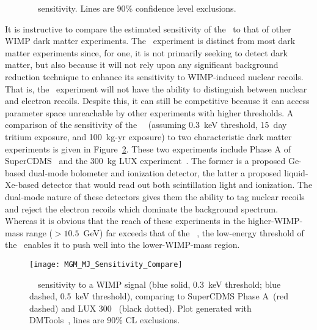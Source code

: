 			\begin{figure}
				\centering
				\def\figheight{0.41\textheight}				
				\caption[\MJ~\minmod~sensitivity to a WIMP signal]{\MJ~\minmod~sensitivity.  Lines are 90\% confidence level exclusions.}
				\label{fig:MJSensitivityToWIMP}
			\end{figure}		
	
	It is instructive to compare the estimated sensitivity of the \minmod~to that of other WIMP dark matter experiments.  The \MJ~experiment is distinct from most dark matter experiments since, for one, it is not primarily seeking to detect dark matter, but also because it will not rely upon any significant background reduction technique to enhance its sensitivity to WIMP-induced nuclear recoils.  That is, the \MJ~experiment will not have the ability to distinguish between nuclear and electron recoils.  Despite this, it can still be competitive because it can access parameter space unreachable by other experiments with higher thresholds.  A comparison of the sensitivity of the \MJ~\minmod~(assuming 0.3~keV threshold, 15~day tritium exposure, and 100~kg-yr exposure) to two characteristic dark matter experiments is given in Figure~\ref{fig:MJSensitivityToWIMPCompare}.  These two experiments include Phase A of SuperCDMS~\cite{Akerib2006411} and the 300~kg LUX experiment~\cite{LUX300}.  The former is a proposed Ge-based dual-mode bolometer and ionization detector, the latter a proposed liquid-Xe-based detector that would read out both scintillation light and ionization.  The dual-mode nature of these detectors gives them the ability to tag nuclear recoils and reject the electron recoils which dominate the background spectrum.  Whereas it is obvious that the reach of these experiments in the higher-WIMP-mass range ($>10.5$~GeV) far exceeds that of the \MJ~\minmod, the low-energy threshold of the \minmod~enables it to push well into the lower-WIMP-mass region.  
		
			\begin{figure}
				\centering
				\texttt{[image: MGM\_MJ\_Sensitivity\_Compare]}
				\caption[\MJ~\minmod~sensitivity to a WIMP signal, comparing to SuperCDMS Phase A and LUX 300.]
				{\MJ~\minmod~sensitivity to a WIMP signal (blue solid, 0.3~keV threshold; blue dashed, 0.5~keV threshold), comparing to SuperCDMS Phase A~\cite{Akerib2006411}(red dashed) and LUX 300~\cite{LUX300}
				(black dotted).  Plot generated with DMTools~\cite{Gai03}, lines are 90\% CL exclusions.}
				\label{fig:MJSensitivityToWIMPCompare}
			\end{figure}			
			
